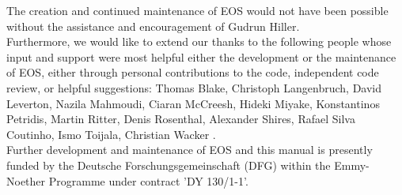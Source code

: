 The creation and continued maintenance of EOS would not have been possible without
the assistance and encouragement of Gudrun Hiller.\\

Furthermore, we would like to extend our thanks to the following people
whose input and support were most helpful either the development or the
maintenance of EOS, either through personal contributions to the code,
independent code review, or helpful suggestions:
Thomas Blake,
Christoph Langenbruch,
David Leverton,
Nazila Mahmoudi,
Ciaran McCreesh,
Hideki Miyake,
Konstantinos Petridis,
Martin Ritter,
Denis Rosenthal,
Alexander Shires,
Rafael Silva Coutinho,
Ismo Toijala,
Christian Wacker
.\\

Further development and maintenance of EOS and this manual is presently funded by the
Deutsche Forschungsgemeinschaft (DFG) within the Emmy-Noether Programme under contract
'DY 130/1-1'.
